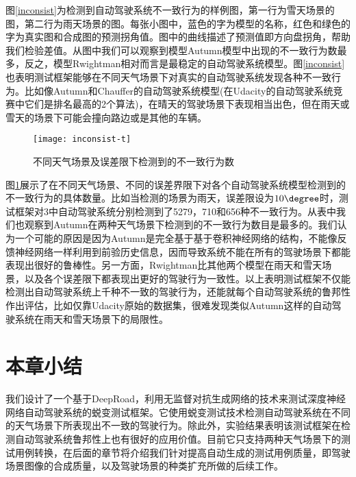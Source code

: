 图\ref{inconsist}为检测到自动驾驶系统不一致行为的样例图，第一行为雪天场景的图，第二行为雨天场景的图。每张小图中，蓝色的字为模型的名称，红色和绿色的字为真实图和合成图的预测拐角值。图中的曲线描述了预测值即方向盘拐角，帮助我们检验差值。从图中我们可以观察到模型Autumn模型中出现的不一致行为数最多，反之，模型Rwightman相对而言是最稳定的自动驾驶系统模型。图\ref{inconsist}也表明测试框架能够在不同天气场景下对真实的自动驾驶系统发现各种不一致行为。比如像Autumn和Chauffer的自动驾驶系统模型(在Udacity的自动驾驶系统竞赛中它们是排名最高的2个算法)，在晴天的驾驶场景下表现相当出色，但在雨天或雪天的场景下可能会撞向路边或是其他的车辆。

\begin{figure}[]
    \centering
    \texttt{[image: inconsist-t]}
    \caption{不同天气场景及误差限下检测到的不一致行为数}
    \label{inconsist-t}
\end{figure}

图\ref{inconsist-t}展示了在不同天气场景、不同的误差界限下对各个自动驾驶系统模型检测到的不一致行为的具体数量。比如当检测的场景为雨天，误差限设为$10\degree$时，测试框架对3中自动驾驶系统分别检测到了5279，710和656种不一致行为。从表中我们也观察到Autumn在两种天气场景下检测到的不一致行为数目是最多的。我们认为一个可能的原因是因为Autumn是完全基于基于卷积神经网络的结构，不能像反馈神经网络一样利用到前验历史信息，因而导致系统不能在所有的驾驶场景下都能表现出很好的鲁棒性。另一方面，Rwightman比其他两个模型在雨天和雪天场景，以及各个误差限下都表现出更好的驾驶行为一致性。以上表明测试框架不仅能检测出自动驾驶系统上千种不一致的驾驶行为，还能就每个自动驾驶系统的鲁邦性作出评估，比如仅靠Udacity原始的数据集，很难发现类似Autumn这样的自动驾驶系统在雨天和雪天场景下的局限性。

\section{本章小结}

我们设计了一个基于DeepRoad\cite{DeepRoad}，利用无监督对抗生成网络的技术来测试深度神经网络自动驾驶系统的蜕变测试框架。它使用蜕变测试技术检测自动驾驶系统在不同的天气场景下所表现出不一致的驾驶行为。除此外，实验结果表明该测试框架在检测自动驾驶系统鲁邦性上也有很好的应用价值。目前它只支持两种天气场景下的测试用例转换，在后面的章节将介绍我们针对提高自动生成的测试用例质量，即驾驶场景图像的合成质量，以及驾驶场景的种类扩充所做的后续工作。